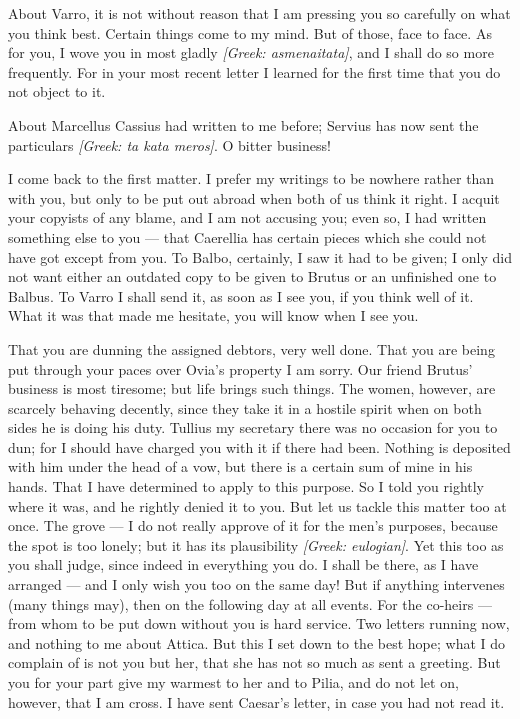 

 About Varro, it is not without reason that I am pressing you so carefully on what you think best. Certain things come to my mind. But of those, face to face. As for you, I wove you in most gladly \textit{[Greek: asmenaitata]}, and I shall do so more frequently. For in your most recent letter I learned for the first time that you do not object to it.

 About Marcellus Cassius had written to me before; Servius has now sent the particulars \textit{[Greek: ta kata meros]}. O bitter business!

 I come back to the first matter. I prefer my writings to be nowhere rather than with you, but only to be put out abroad when both of us think it right. I acquit your copyists of any blame, and I am not accusing you; even so, I had written something else to you --- that Caerellia has certain pieces which she could not have got except from you. To Balbo, certainly, I saw it had to be given; I only did not want either an outdated copy to be given to Brutus or an unfinished one to Balbus. To Varro I shall send it, as soon as I see you, if you think well of it. What it was that made me hesitate, you will know when I see you.

 That you are dunning the assigned debtors, very well done. That you are being put through your paces over Ovia's property I am sorry. Our friend Brutus' business is most tiresome; but life brings such things. The women, however, are scarcely behaving decently, since they take it in a hostile spirit when on both sides he is doing his duty. Tullius my secretary there was no occasion for you to dun; for I should have charged you with it if there had been. Nothing is deposited with him under the head of a vow, but there is a certain sum of mine in his hands. That I have determined to apply to this purpose. So I told you rightly where it was, and he rightly denied it to you. But let us tackle this matter too at once. The grove --- I do not really approve of it for the men's purposes, because the spot is too lonely; but it has its plausibility \textit{[Greek: eulogian]}. Yet this too as you shall judge, since indeed in everything you do. I shall be there, as I have arranged --- and I only wish you too on the same day! But if anything intervenes (many things may), then on the following day at all events. For the co-heirs --- \dag{}from whom to be put down without you is hard service\dag{}. Two letters running now, and nothing to me about Attica. But this I set down to the best hope; what I do complain of is not you but her, that she has not so much as sent a greeting. But you for your part give my warmest to her and to Pilia, and do not let on, however, that I am cross. I have sent Caesar's letter, in case you had not read it.
